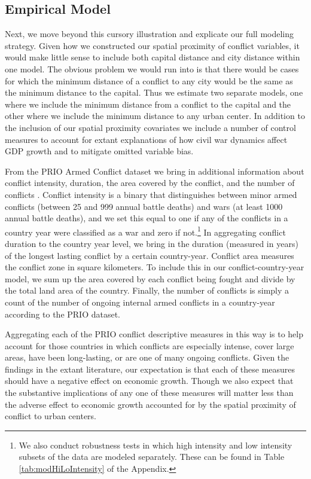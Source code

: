 \subsection{Empirical Model}

Next, we move beyond this cursory illustration and explicate our full modeling strategy. Given how we constructed our spatial proximity of conflict variables, it would make little sense to include both capital distance and city distance within one model. The obvious problem we would run into is that there would be cases for which the minimum distance of a conflict to any city would be the same as the minimum distance to the capital. Thus we estimate two separate models, one where we include the minimum distance from a conflict to the capital and the other where we include the minimum distance to any urban center. In addition to the inclusion of our spatial proximity covariates we include a number of control measures to account for extant explanations of how civil war dynamics affect GDP growth and to mitigate omitted variable bias. 

From the PRIO Armed Conflict dataset we bring in additional information about conflict intensity, duration, the area covered by the conflict, and the number of conflicts \citep{themner:wallensteen:2014}. Conflict intensity is a binary that distinguishes between minor armed conflicts (between 25 and 999 annual battle deaths) and wars (at least 1000 annual battle deaths), and we set this equal to one if any of the conflicts in a country year were classified as a war and zero if not.\footnote{We also conduct robustness tests in which high intensity and low intensity subsets of the data are modeled separately. These can be found in Table \ref{tab:modHiLoIntensity} of the Appendix.} In aggregating conflict duration to the country year level, we bring in the duration (measured in years) of the longest lasting conflict by a certain country-year. Conflict area measures the conflict zone in square kilometers. To include this in our conflict-country-year model, we sum up the area covered by each conflict being fought and divide by the total land area of the country. Finally, the number of conflicts is simply a count of the number of ongoing internal armed conflicts in a country-year according to the PRIO dataset.


Aggregating each of the PRIO conflict descriptive measures in this way is to help account for those countries in which conflicts are especially intense, cover large areas, have been long-lasting, or are one of many ongoing conflicts. Given the findings in the extant literature, our expectation is that each of these measures should have a negative effect on economic growth. Though we also expect that the substantive implications of any one of these measures will matter less than the adverse effect to economic growth accounted for by the spatial proximity of conflict to urban centers.

